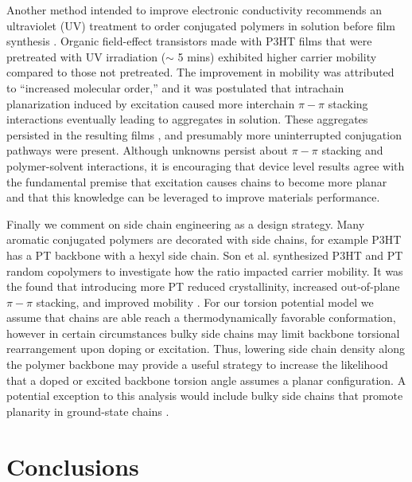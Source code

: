 Another method intended to improve electronic conductivity recommends an ultraviolet (UV) treatment to order conjugated polymers in solution before film synthesis \cite{Chang2014}. Organic field-effect transistors made with P3HT films that were pretreated with UV irradiation ($\sim$ 5 mins) exhibited higher carrier mobility compared to those not pretreated. The improvement in mobility was attributed to ``increased molecular order,'' and it was postulated that intrachain planarization induced by excitation caused more interchain $\pi-\pi$ stacking interactions eventually leading to aggregates in solution. These aggregates persisted in the resulting films \cite{Chang2014}, and presumably more uninterrupted conjugation pathways were present. Although unknowns persist about $\pi-\pi$ stacking and polymer-solvent interactions, it is encouraging that device level results agree with the fundamental premise that excitation causes chains to become more planar and that this knowledge can be leveraged to improve materials performance.

Finally we comment on side chain engineering as a design strategy. Many aromatic conjugated polymers are decorated with side chains, for example P3HT has a PT backbone with a hexyl side chain. Son et al. synthesized P3HT and PT random copolymers to investigate how the ratio impacted carrier mobility. It was the found that introducing more PT reduced crystallinity, increased out-of-plane $\pi-\pi$ stacking, and improved mobility \cite{Son2016}. For our torsion potential model we assume that chains are able reach a thermodynamically favorable conformation, however in certain circumstances bulky side chains may limit backbone torsional rearrangement upon doping or excitation. Thus, lowering side chain density along the polymer backbone may provide a useful strategy to increase the likelihood that a doped or excited backbone torsion angle assumes a planar configuration. A potential exception to this analysis would include bulky side chains that promote planarity in ground-state chains \cite{Raithel2018}.

\section{Conclusions}


